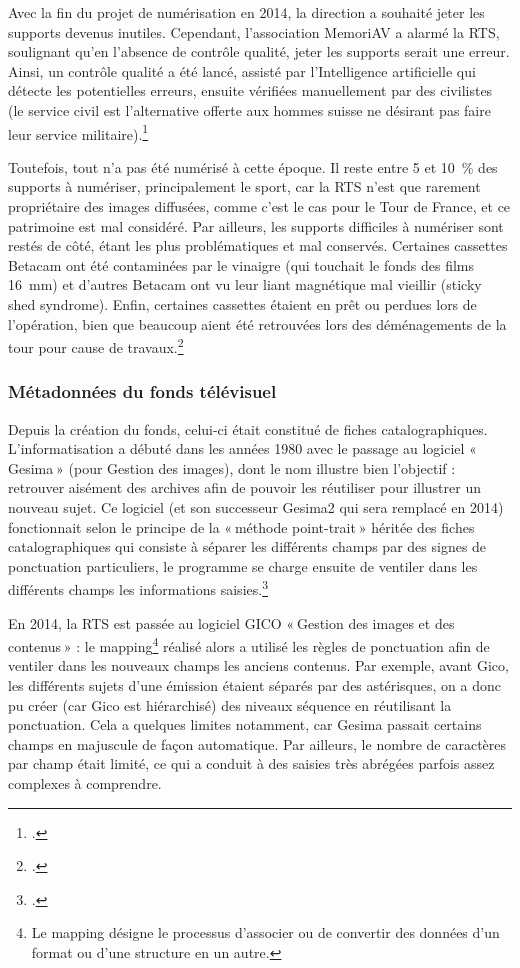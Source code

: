 Avec la fin du projet de numérisation en 2014, la direction a souhaité jeter les supports devenus inutiles. Cependant, l’association MemoriAV a alarmé la RTS, soulignant qu’en l’absence de contrôle qualité, jeter les supports serait une erreur. Ainsi, un contrôle qualité a été lancé, assisté par l’Intelligence artificielle qui détecte les potentielles erreurs, ensuite vérifiées manuellement par des civilistes (le service civil est l'alternative offerte aux hommes suisse ne désirant pas faire leur service militaire).\footcite{barcella2024a}

Toutefois, tout n’a pas été numérisé à cette époque. Il reste entre 5 et 10 \% des supports à numériser, principalement le sport, car la RTS n’est que rarement propriétaire des images diffusées, comme c’est le cas pour le Tour de France, et ce patrimoine est mal considéré. Par ailleurs, les supports difficiles à numériser sont restés de côté, étant les plus problématiques et mal conservés. Certaines cassettes Betacam ont été contaminées par le vinaigre (qui touchait le fonds des films 16 mm) et d’autres Betacam ont vu leur liant magnétique mal vieillir (sticky shed syndrome). Enfin, certaines cassettes étaient en prêt ou perdues lors de l’opération, bien que beaucoup aient été retrouvées lors des déménagements de la tour pour cause de travaux.\footcite{barcella2024a}

\subsubsection{Métadonnées du fonds télévisuel}

Depuis la création du fonds, celui-ci était constitué de fiches catalographiques. L’informatisation a débuté dans les années 1980 avec le passage au logiciel « Gesima » (pour Gestion des images), dont le nom illustre bien l’objectif : retrouver aisément des archives afin de pouvoir les réutiliser pour illustrer un nouveau sujet. Ce logiciel (et son successeur Gesima2 qui sera remplacé en 2014) fonctionnait selon le principe de la « méthode point-trait » héritée des fiches catalographiques qui consiste à séparer les différents champs par des signes de ponctuation particuliers, le programme se charge ensuite de ventiler dans les différents champs les informations saisies.\footcite{barcella2024a}

En 2014, la RTS est passée au logiciel GICO « Gestion des images et des contenus » : le mapping\footnote{Le mapping désigne le processus d'associer ou de convertir des données d'un format ou d'une structure en un autre.} réalisé alors a utilisé les règles de ponctuation afin de ventiler dans les nouveaux champs les anciens contenus. Par exemple, avant Gico, les différents sujets d’une émission étaient séparés par des astérisques, on a donc pu créer (car Gico est hiérarchisé) des niveaux séquence en réutilisant la ponctuation. Cela a quelques limites notamment, car Gesima passait certains champs en majuscule de façon automatique. Par ailleurs, le nombre de caractères par champ était limité, ce qui a conduit à des saisies très abrégées parfois assez complexes à comprendre.

